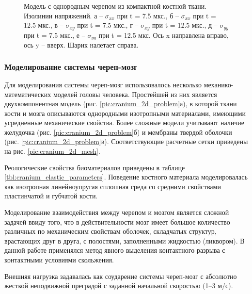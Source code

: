 \begin{figure}[h]
\begin{subfigure}[b]{0.13\textwidth}
\caption{ }
\end{subfigure}
\caption{Модель с однородным черепом из компактной костной ткани.  Изолинии напряжений. а -- $\sigma_{xx}$ при t = 7.5 мкс., б -- $\sigma_{xx}$ при t = 12.5 мкс., в -- $\sigma_{xy}$ при t = 7.5 мкс., г -- $\sigma_{xy}$ при t = 12.5 мкс., д -- $\sigma_{yy}$ при t = 7.5 мкс., е -- $\sigma_{yy}$ при t = 12.5 мкс. Ось x направлена вправо, ось y -- вверх. Шарик налетает справа.}
\label{pic:cranium_2d_simple_model}
\end{figure}

\clearpage
\newpage

\subsubsection*{Моделирование системы череп-мозг}

Для моделирования системы череп-мозг использовалось несколько механико-математических моделей головы человека. Простейшей из них является двухкомпонентная модель (рис. \ref{pic:cranium_2d_problem}а), в которой ткани кости и мозга описываются однородными изотропными материалами, имеющими усредненные механические свойства. Более сложные модели учитывают наличие желудочка (рис. \ref{pic:cranium_2d_problem}б) и мембраны твердой оболочки (рис. \ref{pic:cranium_2d_problem}в). Соответствующие расчетные сетки приведены на рис. \ref{pic:cranium_2d_mesh}.

Реологические свойства биоматериалов приведены в таблице \ref{tbl:cranium_elastic_parameters}. Поведение костного материала моделировалась как изотропная линейноупругая сплошная среда со средними свойствами пластинчатой и губчатой кости.

Моделирование взаимодействия между черепом и мозгом является сложной задачей ввиду того, что в действительности мозг имеет большое количество различных по механическим свойствам оболочек, складчатых структур, врастающих друг в друга, с полостями, заполненными жидкостью (ликвором). В данной работе применялся метод явного выделения контактного разрыва с контактными условиями скольжения.

Внешняя нагрузка задавалась как соударение системы череп-мозг с абсолютно жесткой неподвижной преградой с заданной начальной скоростью (1--3 м/с).

